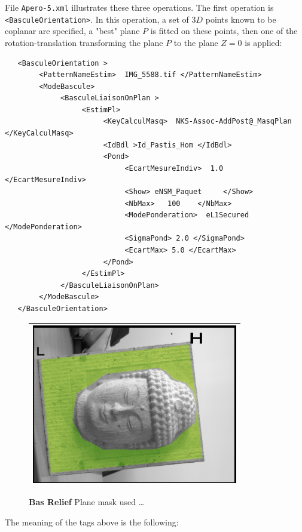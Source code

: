 File {\tt Apero-5.xml} illustrates these three operations.
The first operation is {\tt <BasculeOrientation>}.
In this operation, a set of $3D$ points known to be coplanar are specified,
a "best" plane $P$ is fitted on these points, then one of the  rotation-translation
transforming the plane $P$ to the plane $Z=0$ is applied:


{\scriptsize
\begin{verbatim}
   <BasculeOrientation >
        <PatternNameEstim>  IMG_5588.tif </PatternNameEstim>
        <ModeBascule>
             <BasculeLiaisonOnPlan >
                  <EstimPl>
                       <KeyCalculMasq>  NKS-Assoc-AddPost@_MasqPlan </KeyCalculMasq>
                       <IdBdl >Id_Pastis_Hom </IdBdl>
                       <Pond>
                            <EcartMesureIndiv>  1.0 </EcartMesureIndiv>
                            <Show> eNSM_Paquet     </Show>
                            <NbMax>   100    </NbMax>
                            <ModePonderation>  eL1Secured </ModePonderation>
                            <SigmaPond> 2.0 </SigmaPond>
                            <EcartMax> 5.0 </EcartMax>
                       </Pond>
                  </EstimPl>
             </BasculeLiaisonOnPlan>
        </ModeBascule>
   </BasculeOrientation>
\end{verbatim}
}


\begin{figure}
\begin{tabular}{||c||}
   \hline \hline
   \includegraphics[width=90mm]{FIGS/Boudhas/Masq-Plan-Boudha-Annoted.jpg} \\ \hline  \hline
\end{tabular}
\caption{{\bf Bas Relief} Plane mask used  \dots}
\end{figure}


The meaning of the tags above is the following:

